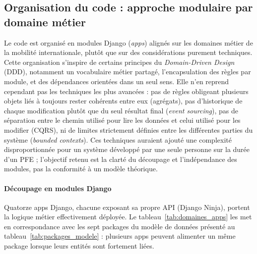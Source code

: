 \subsection{Organisation du code : approche modulaire par domaine métier}

Le code est organisé en modules Django (\textit{apps}) alignés sur les domaines métier de la mobilité internationale, plutôt que sur des considérations purement techniques. Cette organisation s'inspire de certains principes du \textit{Domain-Driven Design} (DDD), notamment un vocabulaire métier partagé, l'encapsulation des règles par module, et des dépendances orientées dans un seul sens. Elle n'en reprend cependant pas les techniques les plus avancées : pas de règles obligeant plusieurs objets liés à toujours rester cohérents entre eux (agrégats), pas d'historique de chaque modification plutôt que du seul résultat final (\textit{event sourcing}), pas de séparation entre le chemin utilisé pour lire les données et celui utilisé pour les modifier (CQRS), ni de limites strictement définies entre les différentes parties du système (\textit{bounded contexts}). Ces techniques auraient ajouté une complexité disproportionnée pour un système développé par une seule personne sur la durée d'un PFE ; l'objectif retenu est la clarté du découpage et l'indépendance des modules, pas la conformité à un modèle théorique.

\paragraph{Découpage en modules Django}

Quatorze apps Django, chacune exposant sa propre API (Django Ninja), portent la logique métier effectivement déployée. Le tableau~\ref{tab:domaines_apps} les met en correspondance avec les sept packages du modèle de données présenté au tableau~\ref{tab:packages_modele} : plusieurs apps peuvent alimenter un même package lorsque leurs entités sont fortement liées.

